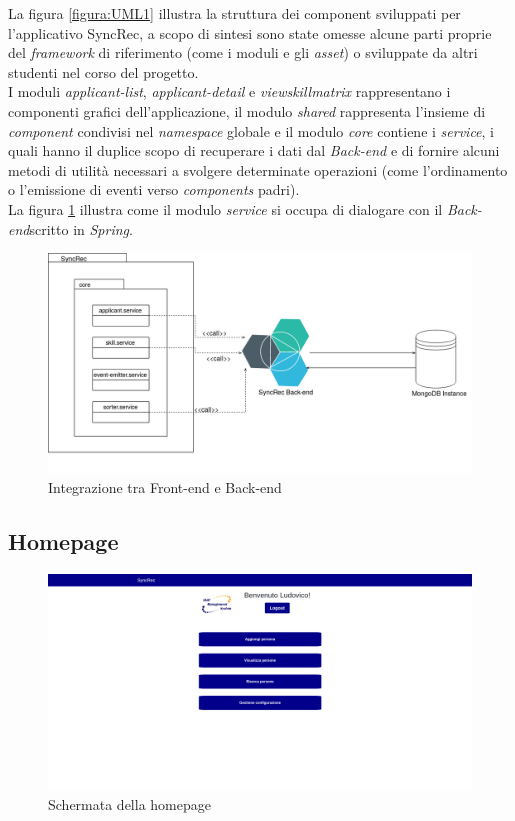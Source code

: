 La figura \ref{figura:UML1} illustra la struttura dei component sviluppati per l'applicativo SyncRec, a scopo di sintesi sono state omesse alcune parti proprie del \textit{framework} di riferimento (come i moduli e gli \textit{asset}) o sviluppate da altri studenti nel corso del progetto.\\
I moduli \textit{applicant-list}, \textit{applicant-detail} e \textit{viewskillmatrix} rappresentano i componenti grafici dell'applicazione, il modulo \textit{shared} rappresenta l'insieme di \textit{component} condivisi nel \textit{namespace} globale e il modulo \textit{core} contiene i \textit{service}, i quali hanno il duplice scopo di recuperare i dati dal \textit{Back-end} e di fornire alcuni metodi di utilità necessari a svolgere determinate operazioni (come l'ordinamento o l'emissione di eventi verso \textit{components} padri).\\
La figura \ref{figura:UML2} illustra come il modulo \textit{service} si occupa di dialogare con il \textit{Back-end}scritto in \textit{Spring}.

\begin{figure}[!h] 
	\centering 
	\includegraphics[width=1\columnwidth]{immagini/usecase/UML2} 
	\caption{Integrazione tra Front-end e Back-end}
	\label{figura:UML2}
\end{figure}

\subsection{Homepage}
\vspace{0.5em}
\begin{figure}[!h] 
	\centering 
	\includegraphics[width=1\columnwidth]{immagini/svil/homepage} 
	\caption{Schermata della homepage}
	\label{figura:homepage}
\end{figure}

